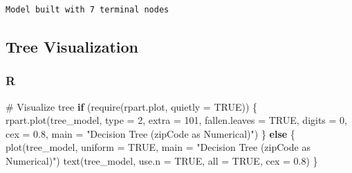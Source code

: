 \documentclass[
  letterpaper,
  DIV=11,
  numbers=noendperiod]{scrartcl}
\newenvironment{Shaded}{\begin{snugshade}}{\end{snugshade}}
\newcommand{\AttributeTok}[1]{\textcolor[rgb]{0.40,0.45,0.13}{#1}}
\newcommand{\CommentTok}[1]{\textcolor[rgb]{0.37,0.37,0.37}{#1}}
\newcommand{\ConstantTok}[1]{\textcolor[rgb]{0.56,0.35,0.01}{#1}}
\newcommand{\ControlFlowTok}[1]{\textcolor[rgb]{0.00,0.23,0.31}{\textbf{#1}}}
\newcommand{\DecValTok}[1]{\textcolor[rgb]{0.68,0.00,0.00}{#1}}
\newcommand{\FloatTok}[1]{\textcolor[rgb]{0.68,0.00,0.00}{#1}}
\newcommand{\FunctionTok}[1]{\textcolor[rgb]{0.28,0.35,0.67}{#1}}
\newcommand{\NormalTok}[1]{\textcolor[rgb]{0.00,0.23,0.31}{#1}}
\newcommand{\SpecialCharTok}[1]{\textcolor[rgb]{0.37,0.37,0.37}{#1}}
\newcommand{\StringTok}[1]{\textcolor[rgb]{0.13,0.47,0.30}{#1}}
\begin{document}
\begin{Shaded}
\end{Shaded}

\begin{verbatim}
Model built with 7 terminal nodes
\end{verbatim}

\subsection{Tree Visualization}\label{tree-visualization}

\subsubsection{R}

\begin{Shaded}
\begin{Highlighting}[]
\CommentTok{\# Visualize tree}
\ControlFlowTok{if}\NormalTok{ (}\FunctionTok{require}\NormalTok{(rpart.plot, }\AttributeTok{quietly =} \ConstantTok{TRUE}\NormalTok{)) \{}
  \FunctionTok{rpart.plot}\NormalTok{(tree\_model, }
             \AttributeTok{type =} \DecValTok{2}\NormalTok{,}
             \AttributeTok{extra =} \DecValTok{101}\NormalTok{,}
             \AttributeTok{fallen.leaves =} \ConstantTok{TRUE}\NormalTok{,}
             \AttributeTok{digits =} \DecValTok{0}\NormalTok{,}
             \AttributeTok{cex =} \FloatTok{0.8}\NormalTok{,}
             \AttributeTok{main =} \StringTok{"Decision Tree (zipCode as Numerical)"}\NormalTok{)}
\NormalTok{\} }\ControlFlowTok{else}\NormalTok{ \{}
  \FunctionTok{plot}\NormalTok{(tree\_model, }\AttributeTok{uniform =} \ConstantTok{TRUE}\NormalTok{, }\AttributeTok{main =} \StringTok{"Decision Tree (zipCode as Numerical)"}\NormalTok{)}
  \FunctionTok{text}\NormalTok{(tree\_model, }\AttributeTok{use.n =} \ConstantTok{TRUE}\NormalTok{, }\AttributeTok{all =} \ConstantTok{TRUE}\NormalTok{, }\AttributeTok{cex =} \FloatTok{0.8}\NormalTok{)}
\NormalTok{\}}
\end{Highlighting}
\end{Shaded}
\end{document}
